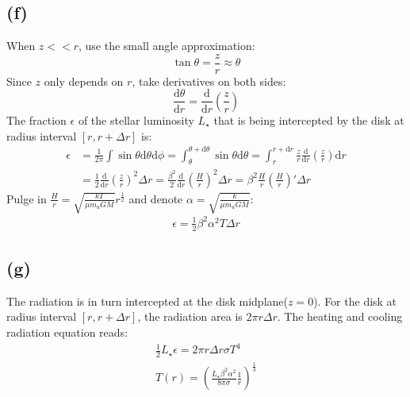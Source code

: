 \documentclass[a4paper,12pt]{article}
\begin{document}
\subsection*{(f)}
When $z<<r$, use the small angle approximation:
\begin{equation*}
    \tan \theta = \frac{z}{r} \approx \theta
\end{equation*}
Since $z$ only depends on $r$, take derivatives on both sides:
\begin{equation*}
    \frac{\text{d} \theta}{\text{d} r} = \frac{\text{d} }{\text{d} r} (\frac{z}{r})
\end{equation*}
The fraction $\epsilon$ of the stellar luminosity $L_\star$ that is being intercepted 
by the disk at radius interval $[r, r + \Delta r]$ is:
\begin{align*}
    \epsilon &= \frac{1}{2\pi} \int \sin \theta \text{d} \theta \text{d} \phi 
    = \int_{\theta}^{\theta + \text{d} \theta} \sin \theta \text{d} \theta 
    = \int_{r}^{r + \text{d} r} \frac{z}{r} \frac{\text{d} }{\mathrm{d} r} (\frac{z}{r}) \text{d}r \\
    &= \frac{1}{2} \frac{\text{d} }{\mathrm{d} r} (\frac{z}{r})^2 \Delta r
    = \frac{\beta^2}{2} \frac{\text{d} }{\mathrm{d} r} (\frac{H}{r})^2 \Delta r = \beta^2 \frac{H}{r} (\frac{H}{r})' \Delta r
\end{align*}
Pulge in $\frac{H}{r} = \sqrt{\frac{kT}{\mu m_u G M}} r^{\frac{1}{2}}$ and denote $\alpha = \sqrt{\frac{k}{\mu m_u G M}}$:
\begin{align*}
    \epsilon = \frac{1}{2} \beta^2 \alpha^2 T \Delta r
\end{align*}


\subsection*{(g)}
The radiation is in turn intercepted at the disk midplane($z=0$). For the disk at radius interval $[r, r + \Delta r]$, 
the radiation area is $2\pi r \Delta r$. The heating and cooling radiation equation reads:
\begin{align*}
    \frac{1}{2} L_\star \epsilon = 2\pi r \Delta r \sigma T^4 \\
    T(r) = (\frac{L_\star \beta^2 \alpha^2}{8\pi \sigma} \frac{1}{r})^{\frac{1}{3}}
\end{align*}
\end{document}
